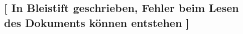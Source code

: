 \subsection{[ In Bleistift geschrieben, Fehler beim Lesen des Dokuments k\"{o}nnen entstehen ]}

\clearpage
